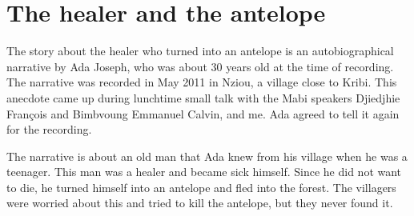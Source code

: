 \section{The healer and the antelope}
\label{sec:Antelope}

The story about the healer who turned into an antelope is an autobiographical narrative by Ada Joseph, who was about 30 years old at the time of recording. The narrative was recorded in May 2011 in Nziou, a village close to Kribi. This anecdote came up during lunchtime small talk with the Mabi speakers Djiedjhie François and Bimbvoung Emmanuel Calvin, and me.  Ada agreed to tell it again for the recording. 

The narrative is about an old man that Ada knew from his village when he was a teenager. This man was a healer and became sick himself. Since he did not want to die, he turned himself into an antelope and fled into the forest. The villagers were worried about this and tried to kill the  antelope, but they never found it.


